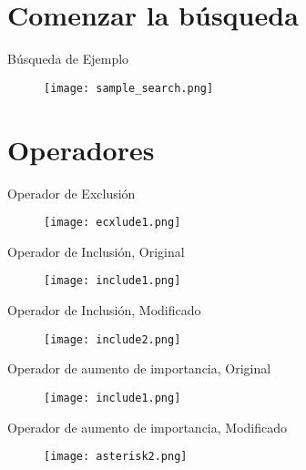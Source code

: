 \documentclass{beamer}
\begin{document}
\section{Comenzar la búsqueda}

\begin{frame}{Búsqueda de Ejemplo}
    \begin{figure}[h]
        \texttt{[image: sample\_search.png]}
    \end{figure}
\end{frame}

\section{Operadores}

\begin{frame}{Operador de Exclusión}
    \begin{figure}[h]
        \texttt{[image: ecxlude1.png]}
    \end{figure}
\end{frame}

\begin{frame}{Operador de Inclusión, Original}
    \begin{figure}[h]
        \texttt{[image: include1.png]}
    \end{figure}
\end{frame}

\begin{frame}{Operador de Inclusión, Modificado}
    \begin{figure}[h]
        \texttt{[image: include2.png]}
    \end{figure}
\end{frame}


\begin{frame}{Operador de aumento de importancia, Original}
    \begin{figure}
        \texttt{[image: include1.png]}
    \end{figure}
\end{frame}

\begin{frame}{Operador de aumento de importancia, Modificado}
    \begin{figure}
        \texttt{[image: asterisk2.png]}
    \end{figure}
\end{frame}
\end{document}
